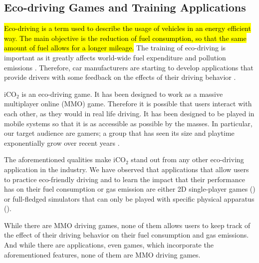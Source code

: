 \documentclass[preprint,authoryear,12pt]{elsarticle}
\newcommand{\hlc}[2][yellow]{ {\sethlcolor{#1} \hl{#2}} }
\newcommand{\question}[1] {} %
\newcommand{\commentShow}[1] {} %
\begin{document}
\subsection{Eco-driving Games and Training Applications}
\label{subsec:eco-driving}

\hlc[green]{
Eco-driving is a term used to describe the usage of vehicles in an energy efficient way. The main objective is the reduction of fuel consumption, so that the same amount of fuel allows for a longer mileage.
} \commentShow{Used to describe where ? In this paper ? In some literature ? The placement should be somewhere else.}
The training of eco-driving is important as it greatly affects world-wide fuel expenditure and pollution emissions \citep{barkenbus2010eco,shaheen2012ecodriving}. Therefore, car manufacturers are starting to develop applications that provide drivers with some feedback on the effects of their driving behavior \citep{EcoTools,FiatEcoGame}.

iCO$_2$ is \question{first and foremost} an eco-driving game. It has been designed to work as a massive multiplayer online (MMO) game. Therefore it is possible that users interact with each other, as they would in real life driving. It has been designed to be played in mobile systems so that it is as  accessible as possible by the masses. In particular, our target audience are gamers; a group that has seen its size and playtime exponentially grow over recent years \citep{MobileStats}.


\question{It is important to note that the player is not the only one who receives feedback on his or her  driving. Our underlying data gathering system can provide important information to future developers of iCO$_2$ on how to improve the design of the eco-driving simulator.} \commentShow{needs to be re-written.}

The aforementioned qualities make iCO$_2$ stand out from any other eco-driving application in the industry. \commentShow{Really ? It's just an opinion, not an academic claim. }
We have observed that applications that allow users to practice eco-friendly driving and to learn the impact that their performance has on their fuel consumption or gas emission are either 2D single-player games (\cite{EcoGame1, EcoGame2, TruckEcoGame, Moebius, FiatEcoGame}) or full-fledged simulators that can only be played with specific physical apparatus (\cite{EcoSimulator, GreenDino, EcoSimulator2, sabrina2013enhanced}). \commentShow{Bad placement}

While there are MMO driving games, none of them allows users to keep track of the effect of their driving behavior on their fuel consumption and gas emissions. And while there are applications, even games, which incorporate the aforementioned features, none of them are MMO driving games.
\end{document}
